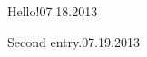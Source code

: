 \begin{diary}{Hello!}{07.18.2013}
 \lipsum[1]
\end{diary}


\begin{diary}{Second entry.}{07.19.2013}
 \lipsum[2]
\end{diary}